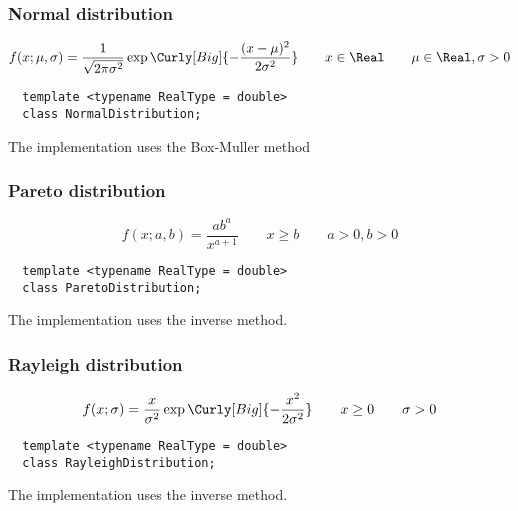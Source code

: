 \subsubsection{Normal distribution}

\begin{equation*}
  f(x;\mu,\sigma) =
  \frac{1}{\sqrt{2\pi\sigma^2}}\exp\Curly[Big]{-\frac{(x-\mu)^2}{2\sigma^2}}
  \qquad x \in \Real
  \qquad \mu \in \Real, \sigma > 0
\end{equation*}
\begin{Verbatim}
  template <typename RealType = double>
  class NormalDistribution;
\end{Verbatim}
The implementation uses the Box-Muller method \parencite{Box:1958hv}

\subsubsection{Pareto distribution}

\begin{equation*}
  f(x;a,b) = \frac{a b^a}{x^{a + 1}}
  \qquad x \ge b
  \qquad a > 0, b > 0
\end{equation*}
\begin{Verbatim}
  template <typename RealType = double>
  class ParetoDistribution;
\end{Verbatim}
The implementation uses the inverse method.

\subsubsection{Rayleigh distribution}

\begin{equation*}
  f(x;\sigma) = \frac{x}{\sigma^2}\exp\Curly[Big]{-\frac{x^2}{2\sigma^2}}
  \qquad x \ge 0
  \qquad \sigma > 0
\end{equation*}
\begin{Verbatim}
  template <typename RealType = double>
  class RayleighDistribution;
\end{Verbatim}
The implementation uses the inverse method.


